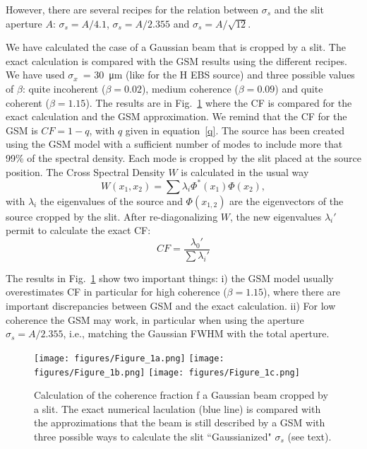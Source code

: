 \documentclass{iucr}              %
\begin{document}
However, there are several recipes for the relation between $\sigma_s$ and the slit aperture $A$: $\sigma_s=A/4.1$, $\sigma_s=A/2.355$ and $\sigma_s=A/\sqrt{12}$.

We have calculated the case of a Gaussian beam that is cropped by a slit. The exact calculation is compared with the GSM results using the different recipes. We have used $\sigma_x$~= \SI{30}{\micro\meter} (like for the H EBS source) and three possible values of $\beta$: quite incoherent ($\beta=0.02$), medium coherence ($\beta=0.09$) and quite coherent ($\beta=1.15$). The results are in Fig.~\ref{fig:GSMslit} where the CF is compared for the exact calculation and the GSM approximation. We remind that the CF for the GSM is $CF = 1 - q$, with $q$ given in equation~\ref{q}.
The source has been created using the GSM model with a sufficient number of modes to include more that 99\% of the spectral density. Each mode is cropped by the slit placed at the source position. The Cross Spectral Density $W$ is calculated in the usual way 
\begin{equation}
    W(x_1,x_2) = \sum \lambda_i \Phi^*(x_1) \Phi(x_2),     
\end{equation}
with $\lambda_i$ the eigenvalues of the source and $\Phi(x_{1,2})$ are the eigenvectors of the source cropped by the slit. After re-diagonalizing $W$, the new eigenvalues $\lambda_i'$ permit to calculate the exact CF: 
\begin{equation}
    CF = \frac{\lambda_0'}{\sum \lambda_i'}
\end{equation}

The results in Fig.~\ref{fig:GSMslit} show two important things:
i) the GSM model usually overestimates CF in particular for high coherence ($\beta=1.15$), where there are important discrepancies between GSM and the exact calculation.
ii) For low coherence the GSM may work, in particular when using the aperture $\sigma_s=A/2.355$, i.e., matching the Gaussian FWHM with the total aperture.

\begin{figure}
    \centering
    \texttt{[image: figures/Figure\_1a.png]}
    \texttt{[image: figures/Figure\_1b.png]}
    \texttt{[image: figures/Figure\_1c.png]}
    \caption{Calculation of the coherence fraction f a Gaussian beam cropped by a slit. The exact numerical laculation (blue line) is compared with the approzimations that the beam is still described by a GSM with three possible ways to calculate the slit ``Gaussianized" $\sigma_s$ (see text). }
    \label{fig:GSMslit}
\end{figure}
\end{document}
